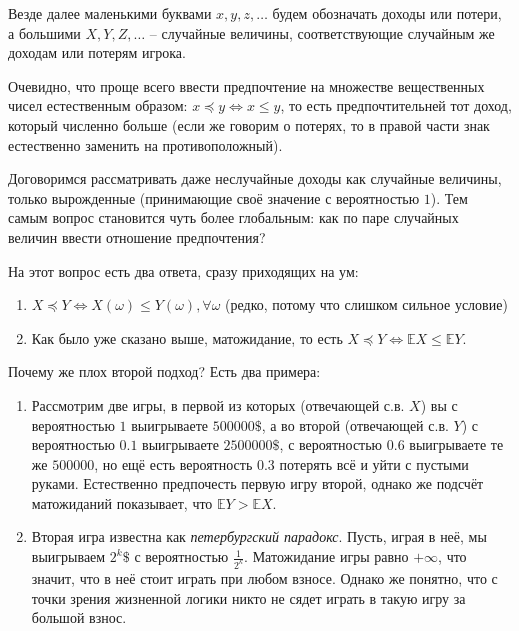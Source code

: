 \documentclass{article}
\theoremstyle{definition}
\begin{document}
Везде далее маленькими буквами $x, y, z, \ldots$ будем обозначать доходы или потери, а большими $X, Y, Z, \ldots$ -- случайные величины, соответствующие случайным же доходам или потерям игрока. 

Очевидно, что проще всего ввести предпочтение на множестве вещественных чисел естественным образом: $x \preceq y \Longleftrightarrow x \le y$, то есть предпочтительней тот доход, который численно больше (если же говорим о потерях, то в правой части знак естественно заменить на противоположный).

Договоримся рассматривать даже неслучайные доходы как случайные величины, только вырожденные (принимающие своё значение с вероятностью $1$). Тем самым вопрос становится чуть более глобальным: как по паре случайных величин ввести отношение предпочтения?

На этот вопрос есть два ответа, сразу приходящих на ум:
\begin{enumerate}
    \item $X \preceq Y \Longleftrightarrow X(\omega) \le Y(\omega), \forall \omega$ (редко, потому что слишком сильное условие)
    \item Как было уже сказано выше, матожидание, то есть $X \preceq Y \Longleftrightarrow \mathbb{E}X \le \mathbb{E}Y$.
\end{enumerate}
Почему же плох второй подход? Есть два примера:
\begin{enumerate}
    \item Рассмотрим две игры, в первой из которых (отвечающей с.в. $X$) вы с вероятностью $1$ выигрываете $500000\$$, а во второй (отвечающей с.в. $Y$) с вероятностью $0.1$ выигрываете $2500000\$$, с вероятностью $0.6$ выигрываете те же $500000$, но ещё есть вероятность $0.3$ потерять всё и уйти с пустыми руками. Естественно предпочесть первую игру второй, однако же подсчёт матожиданий показывает, что $\mathbb{E}Y > \mathbb{E}X$.
    \item Вторая игра известна как \textit{петербургский парадокс}. Пусть, играя в неё, мы выигрываем $2^k\$$ с вероятностью $\frac{1}{2^k}$. Матожидание игры равно $+\infty$, что значит, что в неё стоит играть при любом взносе. Однако же понятно, что с точки зрения жизненной логики никто не сядет играть в такую игру за большой взнос.
\end{enumerate}
\end{document}
